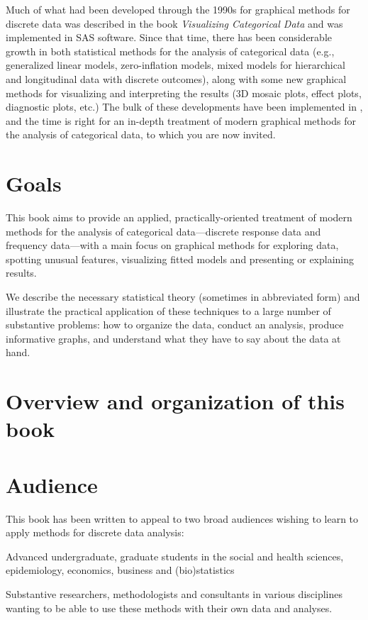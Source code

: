 Much of what had been developed through the 1990s for graphical methods for
discrete data was described in the book \emph{Visualizing Categorical Data}
\citep{Friendly:00:VCD} and was implemented in SAS\textsuperscript{\textregistered} software. 
Since that time,  
there has been considerable growth in both statistical methods for the
analysis of categorical data (e.g., generalized linear models, zero-inflation
models, mixed models for hierarchical and longitudinal data with discrete
outcomes), along with some new graphical methods for visualizing and
interpreting the results (3D mosaic plots, effect plots, diagnostic plots, etc.) 
The bulk of these developments have been implemented in \R, and the time is
right for an in-depth treatment of modern graphical methods for the analysis
of categorical data, to which you are now invited.

\section*{Goals}
This book aims to provide an applied, practically-oriented treatment of 
modern methods for the analysis of categorical data---discrete response data
and frequency data---with a main focus on graphical methods for exploring data,
spotting unusual features, visualizing fitted models and presenting or explaining
results.

We describe the necessary statistical theory (sometimes in abbreviated form)
and illustrate the practical application of these techniques to a large number
of substantive problems: how to organize the data, conduct an analysis, 
produce informative graphs, and understand what they have to say about the
data at hand.  

\section*{Overview and organization of this book}

 
\section*{Audience}
This book has been written to appeal to two broad audiences wishing to learn to apply methods for
discrete data analysis:
 \begin{itemize*}
   \item Advanced undergraduate, graduate students in the social and health sciences, epidemiology,
     economics, business and (bio)statistics
 	\item Substantive researchers, methodologists and consultants in various disciplines wanting to be able to use
 	 these methods with their own data and analyses.
 \end{itemize*}

